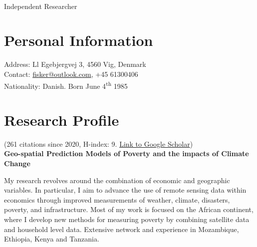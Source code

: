 \documentclass[a4paper,11pt]{article}
\begin{document}
\vspace{0.2cm}\\
{\Large Independent Researcher}
\section{Personal Information}
Address: Ll Egebjergvej 3, 4560 Vig, Denmark\\
Contact: \href{mailto:fisker@outlook.com}{fisker@outlook.com}, +45 61300406\\
Nationality: Danish. Born June 4\textsuperscript{th} 1985\\

\section{Research Profile}
(261 citations since 2020, H-index: 9. \href{https://scholar.google.dk/citations?user=VpEv4Q4AAAAJ&hl=en}{Link to Google Scholar})\vspace{0.2cm}\\
\textbf{Geo-spatial Prediction Models of Poverty and the impacts of Climate Change}

\noindent My research revolves around the combination of economic and geographic variables. In particular, I aim to advance the use of remote sensing data within economics through improved measurements of weather, climate, disasters, poverty, and infrastructure. Most of my work is focused on the African continent, where I develop new methods for measuring poverty by combining satellite data and household level data. Extensive network and experience in Mozambique, Ethiopia, Kenya and Tanzania.
\end{document}
